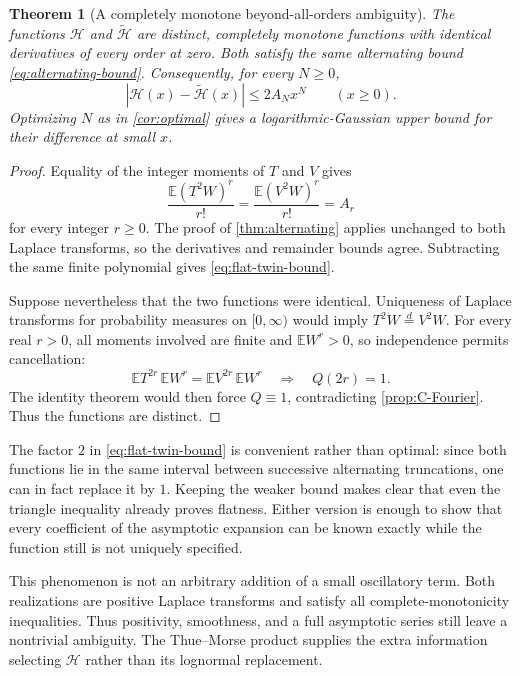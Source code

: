 \documentclass[11pt,a4paper]{article}
\numberwithin{equation}{section}
\newtheorem{theorem}{Theorem}[section]
\theoremstyle{definition}
\theoremstyle{remark}
\newcommand{\E}{\mathbb E}
\newcommand{\abs}[1]{\left|#1\right|}
\newcommand{\calH}{\mathcal H}
\begin{document}
\begin{theorem}[A completely monotone beyond-all-orders ambiguity]
\label{thm:flat-twins}
The functions $\calH$ and $\widetilde{\calH}$ are distinct, completely
monotone functions with identical derivatives of every order at
zero. Both satisfy the same alternating bound
\cref{eq:alternating-bound}. Consequently, for every $N\ge0$,
\begin{equation}
 \abs{\calH(x)-\widetilde{\calH}(x)}\le2A_Nx^N
 \qquad(x\ge0).
 \label{eq:flat-twin-bound}
\end{equation}
Optimizing $N$ as in \cref{cor:optimal} gives a logarithmic-Gaussian
upper bound for their difference at small $x$.
\end{theorem}
\begin{proof}
Equality of the integer moments of $T$ and $V$ gives
\[
 \frac{\E(T^2W)^r}{r!}
 =\frac{\E(V^2W)^r}{r!}=A_r
\]
for every integer $r\ge0$. The proof of
\cref{thm:alternating} applies unchanged to both Laplace transforms,
so the derivatives and remainder bounds agree. Subtracting the
same finite polynomial gives \cref{eq:flat-twin-bound}.

Suppose nevertheless that the two functions were identical.
Uniqueness of Laplace transforms for probability measures on
$[0,\infty)$ would imply $T^2W\overset d=V^2W$.
For every real $r>0$, all moments involved are finite and
$\E W^r>0$, so independence permits cancellation:
\[
 \E T^{2r}\,\E W^r=\E V^{2r}\,\E W^r
 \quad\Longrightarrow\quad Q(2r)=1.
\]
The identity theorem would then force $Q\equiv1$, contradicting
\cref{prop:C-Fourier}. Thus the functions are distinct.
\end{proof}

The factor $2$ in \cref{eq:flat-twin-bound} is convenient rather than
optimal: since both functions lie in the same interval between
successive alternating truncations, one can in fact replace it by
$1$. Keeping the weaker bound makes clear that even the triangle
inequality already proves flatness. Either version is enough to
show that every coefficient of the asymptotic expansion can be
known exactly while the function still is not uniquely specified.

This phenomenon is not an arbitrary addition of a small oscillatory
term. Both realizations are positive Laplace transforms and satisfy
all complete-monotonicity inequalities. Thus positivity, smoothness,
and a full asymptotic series still leave a nontrivial ambiguity.
The Thue--Morse product supplies the extra information selecting
$\calH$ rather than its lognormal replacement.
\end{document}
